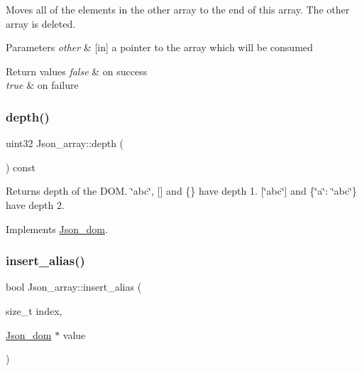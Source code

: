 Moves all of the elements in the other array to the end of this array. The other array is deleted.


\begin{DoxyParams}{Parameters}
{\em other} & \mbox{[}in\mbox{]} a pointer to the array which will be consumed \\
\hline
\end{DoxyParams}

\begin{DoxyRetVals}{Return values}
{\em false} & on success \\
\hline
{\em true} & on failure \\
\hline
\end{DoxyRetVals}
\mbox{\label{classJson__array_a2ab9cb0a7b55a817c9babb6a74b3922e}} 
\subsubsection{\texorpdfstring{depth()}{depth()}}
{\footnotesize\ttfamily uint32 Json\+\_\+array\+::depth (\begin{DoxyParamCaption}{ }\end{DoxyParamCaption}) const\hspace{0.3cm}{\ttfamily [virtual]}}

\begin{DoxyReturn}{Returns}
depth of the D\+OM. \char`\"{}abc\char`\"{}, \mbox{[}\mbox{]} and \{\} have depth 1. \mbox{[}\char`\"{}abc\char`\"{}\mbox{]} and \{\char`\"{}a\char`\"{}\+: \char`\"{}abc\char`\"{}\} have depth 2. 
\end{DoxyReturn}


Implements \mbox{\hyperlink{classJson__dom_a779b8c6ac78329409f8be12e6d082782}{Json\+\_\+dom}}.

\mbox{\label{classJson__array_a9638175903fd33aa8bde389d028a7eb7}} 
\subsubsection{\texorpdfstring{insert\+\_\+alias()}{insert\_alias()}}
{\footnotesize\ttfamily bool Json\+\_\+array\+::insert\+\_\+alias (\begin{DoxyParamCaption}\item[{size\+\_\+t}]{index,  }\item[{\mbox{\hyperlink{classJson__dom}{Json\+\_\+dom}} $\ast$}]{value }\end{DoxyParamCaption})}

